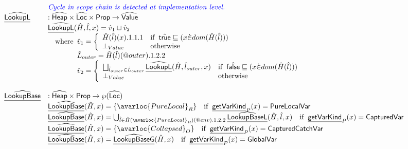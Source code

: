 \[\begin{array}{ll}
& {\inblue \textit{Cycle in scope chain is detected at implementation level.}} \\
\ahf{LookupL} & : \aHeap \times \aLoc \times \SF{Prop} \rightarrow \aValue \\
& \ahf{LookupL}(\hat{H}, \hat{l}, x) = \hat{v}_1 \sqcup \hat{v}_2 \\
& \quad\wherec{
    \hat{v}_1 =
      \left\{
      \begin{array}{ll}
        \hat{H}(\hat{l})(x).1.1.1 & \ifc{\atrue \sqsubseteq (x \dot{\in} dom(\hat{H}(\hat{l})))}\\
        \bot_{Value} & \owc \\
      \end{array}
      \right.\\
    \hat{L}_{outer} = \hat{H}(\hat{l})(\varprop{outer}).1.2.2 \\
    \hat{v}_2 =
      \left\{
      \begin{array}{ll}
        \bigsqcup_{\hat{l}_{outer}\in\hat{L}_{outer}}\ahf{LookupL}(\hat{H}, \hat{l}_{outer}, x) 
          & \ifc{\afalse \sqsubseteq(x \dot{\in} dom(\hat{H}(\hat{l})))} \\
        \bot_{Value} & \owc \\
      \end{array}
      \right.\\
  } \\
\\

\ahf{LookupBase} & : \aHeap \times \SF{Prop} \rightarrow \powerset{\aLoc}\\
& \ahf{LookupBase}(\hat{H},x) = \{ \avarloc{PureLocal}_R \} 
    \quad\ifc{\chf{getVarKind}_P(x) = \SF{PureLocalVar}} \\
& \ahf{LookupBase}(\hat{H},x) = \bigcup_{\hat{l}\in\hat{H}(\avarloc{PureLocal}_R)(\varprop{env}).1.2.2} \ahf{LookupBaseL}(\hat{H},\hat{l},x)
    \quad\ifc{\chf{getVarKind}_P(x) = \SF{CapturedVar}} \\
& \ahf{LookupBase}(\hat{H},x) = \{ \avarloc{Collapsed}_O \} 
    \quad\ifc{\chf{getVarKind}_P(x) = \SF{CapturedCatchVar}} \\
& \ahf{LookupBase}(\hat{H},x) = \ahf{LookupBaseG}(\hat{H},x)
    \quad\ifc{\chf{getVarKind}_P(x) = \SF{GlobalVar}} \\
\\


\end{array}\]
